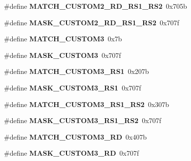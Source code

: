 \begin{DoxyCompactItemize}
\item 
\mbox{\label{riscv-utility_8h_aad2c73ccb67993489db2dcf34a99d220}} 
\#define {\bfseries M\+A\+T\+C\+H\+\_\+\+C\+U\+S\+T\+O\+M2\+\_\+\+R\+D\+\_\+\+R\+S1\+\_\+\+R\+S2}~0x705b
\item 
\mbox{\label{riscv-utility_8h_a6dbcf8e96eb00806ac22b3414183e454}} 
\#define {\bfseries M\+A\+S\+K\+\_\+\+C\+U\+S\+T\+O\+M2\+\_\+\+R\+D\+\_\+\+R\+S1\+\_\+\+R\+S2}~0x707f
\item 
\mbox{\label{riscv-utility_8h_a7754c4719918ada07fcc06fc09c8af76}} 
\#define {\bfseries M\+A\+T\+C\+H\+\_\+\+C\+U\+S\+T\+O\+M3}~0x7b
\item 
\mbox{\label{riscv-utility_8h_a557f57d784527cfda5bec9ab57c2868f}} 
\#define {\bfseries M\+A\+S\+K\+\_\+\+C\+U\+S\+T\+O\+M3}~0x707f
\item 
\mbox{\label{riscv-utility_8h_ae6301b7292a14a62de48db40c3aa323a}} 
\#define {\bfseries M\+A\+T\+C\+H\+\_\+\+C\+U\+S\+T\+O\+M3\+\_\+\+R\+S1}~0x207b
\item 
\mbox{\label{riscv-utility_8h_a911d4ec8c6027f1a32252036b0344274}} 
\#define {\bfseries M\+A\+S\+K\+\_\+\+C\+U\+S\+T\+O\+M3\+\_\+\+R\+S1}~0x707f
\item 
\mbox{\label{riscv-utility_8h_a6abbb0146d5d21df41fddbf02e33b8a0}} 
\#define {\bfseries M\+A\+T\+C\+H\+\_\+\+C\+U\+S\+T\+O\+M3\+\_\+\+R\+S1\+\_\+\+R\+S2}~0x307b
\item 
\mbox{\label{riscv-utility_8h_af88b03868270bfd7d3faa9216eb54ce4}} 
\#define {\bfseries M\+A\+S\+K\+\_\+\+C\+U\+S\+T\+O\+M3\+\_\+\+R\+S1\+\_\+\+R\+S2}~0x707f
\item 
\mbox{\label{riscv-utility_8h_a9079b4a27450809ed7adf179b2fdebfe}} 
\#define {\bfseries M\+A\+T\+C\+H\+\_\+\+C\+U\+S\+T\+O\+M3\+\_\+\+RD}~0x407b
\item 
\mbox{\label{riscv-utility_8h_ac2530f519f1827bbf42c5f567897c8af}} 
\#define {\bfseries M\+A\+S\+K\+\_\+\+C\+U\+S\+T\+O\+M3\+\_\+\+RD}~0x707f

\end{DoxyCompactItemize}
